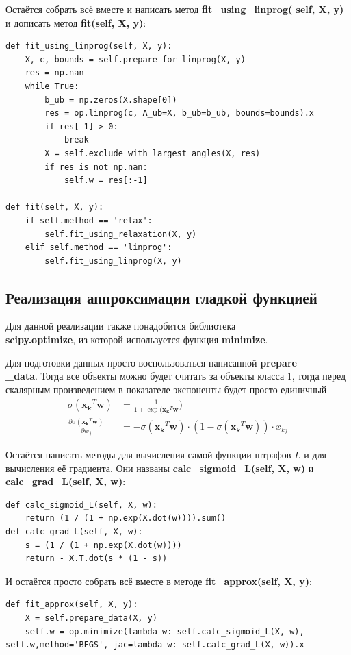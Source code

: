 \documentclass[a4paper]{article}
\newcommand{\w}{\bm{w}}
\newcommand{\xk}{\bm{x_k}}
\newcommand{\xkj}{x_{kj}}
\begin{document}
Остаётся собрать всё вместе и написать метод \textbf{fit\_using\_linprog( self, X, y)} и дописать метод \textbf{fit(self, X, y)}:
\begin{lstlisting}
def fit_using_linprog(self, X, y):
	X, c, bounds = self.prepare_for_linprog(X, y)
	res = np.nan
	while True:
		b_ub = np.zeros(X.shape[0])
		res = op.linprog(c, A_ub=X, b_ub=b_ub, bounds=bounds).x
		if res[-1] > 0:
			break
		X = self.exclude_with_largest_angles(X, res)
		if res is not np.nan:
			self.w = res[:-1]
            
def fit(self, X, y):
	if self.method == 'relax':
		self.fit_using_relaxation(X, y)
	elif self.method == 'linprog':
		self.fit_using_linprog(X, y)
\end{lstlisting}

\subsection{Реализация аппроксимации гладкой функцией}

Для данной реализации также понадобится библиотека\\ \textbf{scipy.optimize}, из которой используется функция \textbf{minimize}.

Для подготовки данных просто воспользоваться написанной \textbf{prepare\\\_data}. Тогда все объекты можно будет считать за объекты класса 1, тогда перед скалярным произведением в показателе экспоненты будет просто единичный 
\begin{align*}
\sigma(\xk^T\w) & = \frac{1}{1 + \exp(\xk^T\w})\\
\frac{\partial \sigma(\xk^T\w)}{\partial w_j} & = - \sigma(\xk^T\w) \cdot (1 - \sigma(\xk^T\w)) \cdot \xkj 
\end{align*}

Остаётся написать методы для вычисления самой функции штрафов $L$ и для вычисления её градиента. Они названы \textbf{calc\_sigmoid\_L(self, X, w)} и \textbf{calc\_grad\_L(self, X, w)}:
\begin{lstlisting}
def calc_sigmoid_L(self, X, w):
	return (1 / (1 + np.exp(X.dot(w)))).sum()
def calc_grad_L(self, X, w):
	s = (1 / (1 + np.exp(X.dot(w))))
	return - X.T.dot(s * (1 - s))
\end{lstlisting}

И остаётся просто собрать всё вместе в методе \textbf{fit\_approx(self, X, y)}:
\begin{lstlisting}
def fit_approx(self, X, y):
	X = self.prepare_data(X, y)
	self.w = op.minimize(lambda w: self.calc_sigmoid_L(X, w), self.w,method='BFGS', jac=lambda w: self.calc_grad_L(X, w)).x
\end{lstlisting}
\end{document}
